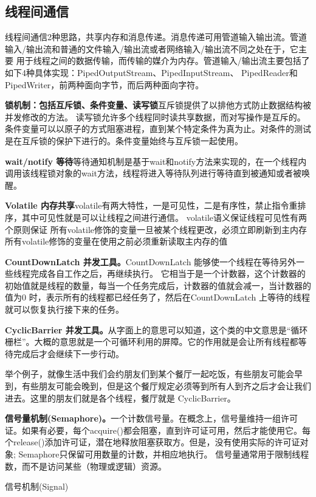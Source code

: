 \documentclass[../../../interview-questions.tex]{subfiles}
\begin{document}
\subsection{线程间通信}

线程间通信2种思路，共享内存和消息传递。消息传递可用管道输入输出流。管道输入/输出流和普通的文件输入/输出流或者网络输入/输出流不同之处在于，它主要 用于线程之间的数据传输，而传输的媒介为内存。管道输入/输出流主要包括了如下4种具体实现：PipedOutputStream、PipedInputStream、 PipedReader和PipedWriter，前两种面向字节，而后两种面向字符。

\textbf{锁机制：包括互斥锁、条件变量、读写锁}互斥锁提供了以排他方式防止数据结构被并发修改的方法。 读写锁允许多个线程同时读共享数据，而对写操作是互斥的。 条件变量可以以原子的方式阻塞进程，直到某个特定条件为真为止。对条件的测试是在互斥锁的保护下进行的。条件变量始终与互斥锁一起使用。

\textbf{wait/notify 等待}等待通知机制是基于wait和notify方法来实现的，在一个线程内调用该线程锁对象的wait方法，线程将进入等待队列进行等待直到被通知或者被唤醒。

\textbf{Volatile 内存共享}volatile有两大特性，一是可见性，二是有序性，禁止指令重排序，其中可见性就是可以让线程之间进行通信。
volatile语义保证线程可见性有两个原则保证
所有volatile修饰的变量一旦被某个线程更改，必须立即刷新到主内存
所有volatile修饰的变量在使用之前必须重新读取主内存的值

\textbf{CountDownLatch 并发工具。}CountDownLatch 能够使一个线程在等待另外一些线程完成各自工作之后，再继续执行。 它相当于是一个计数器，这个计数器的初始值就是线程的数量，每当一个任务完成后，计数器的值就会减一，当计数器的值为0 时，表示所有的线程都已经任务了，然后在CountDownLatch 上等待的线程就可以恢复执行接下来的任务。

\textbf{CyclicBarrier 并发工具。}从字面上的意思可以知道，这个类的中文意思是“循环栅栏”。大概的意思就是一个可循环利用的屏障。它的作用就是会让所有线程都等待完成后才会继续下一步行动。

举个例子，就像生活中我们会约朋友们到某个餐厅一起吃饭，有些朋友可能会早到，有些朋友可能会晚到，但是这个餐厅规定必须等到所有人到齐之后才会让我们进去。这里的朋友们就是各个线程，餐厅就是 CyclicBarrier。

\textbf{信号量机制(Semaphore)。}一个计数信号量。在概念上，信号量维持一组许可证。如果有必要，每个acquire()都会阻塞，直到许可证可用，然后才能使用它。每个release()添加许可证，潜在地释放阻塞获取方。但是，没有使用实际的许可证对象; Semaphore只保留可用数量的计数，并相应地执行。
信号量通常用于限制线程数，而不是访问某些（物理或逻辑）资源。

信号机制(Signal)
\end{document}
